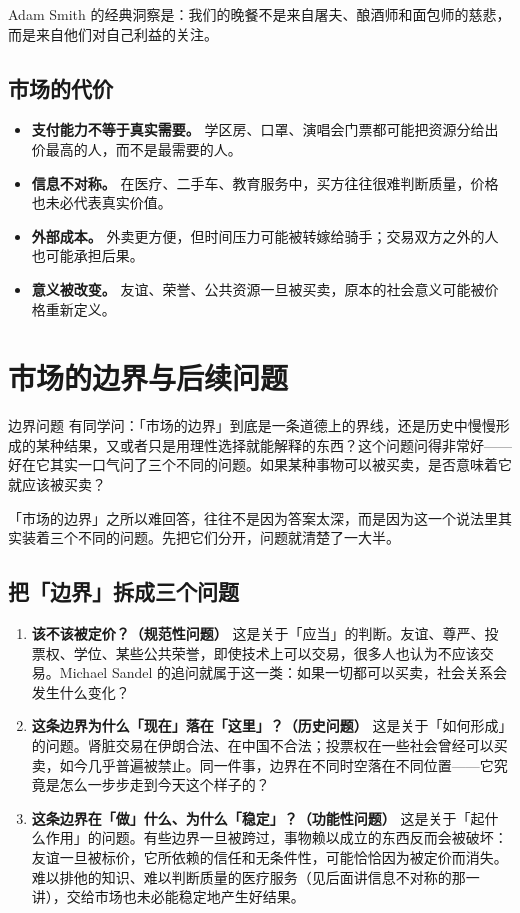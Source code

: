 \documentclass[10pt,a4paper]{ctexart}
\begin{document}
Adam Smith 的经典洞察是：我们的晚餐不是来自屠夫、酿酒师和面包师的慈悲，而是来自他们对自己利益的关注。

\subsection{市场的代价}

\begin{itemize}
  \item \textbf{支付能力不等于真实需要。} 学区房、口罩、演唱会门票都可能把资源分给出价最高的人，而不是最需要的人。
  \item \textbf{信息不对称。} 在医疗、二手车、教育服务中，买方往往很难判断质量，价格也未必代表真实价值。
  \item \textbf{外部成本。} 外卖更方便，但时间压力可能被转嫁给骑手；交易双方之外的人也可能承担后果。
  \item \textbf{意义被改变。} 友谊、荣誉、公共资源一旦被买卖，原本的社会意义可能被价格重新定义。
\end{itemize}

\section{市场的边界与后续问题}

\begin{discussionbox}{边界问题}
有同学问：「市场的边界」到底是一条道德上的界线，还是历史中慢慢形成的某种结果，又或者只是用理性选择就能解释的东西？这个问题问得非常好——好在它其实一口气问了三个不同的问题。如果某种事物可以被买卖，是否意味着它就应该被买卖？
\end{discussionbox}

「市场的边界」之所以难回答，往往不是因为答案太深，而是因为这一个说法里其实装着三个不同的问题。先把它们分开，问题就清楚了一大半。

\subsection{把「边界」拆成三个问题}

\begin{enumerate}
  \item \textbf{该不该被定价？（规范性问题）} 这是关于「应当」的判断。友谊、尊严、投票权、学位、某些公共荣誉，即使技术上可以交易，很多人也认为不应该交易。Michael Sandel 的追问就属于这一类：如果一切都可以买卖，社会关系会发生什么变化？
  \item \textbf{这条边界为什么「现在」落在「这里」？（历史问题）} 这是关于「如何形成」的问题。肾脏交易在伊朗合法、在中国不合法；投票权在一些社会曾经可以买卖，如今几乎普遍被禁止。同一件事，边界在不同时空落在不同位置——它究竟是怎么一步步走到今天这个样子的？
  \item \textbf{这条边界在「做」什么、为什么「稳定」？（功能性问题）} 这是关于「起什么作用」的问题。有些边界一旦被跨过，事物赖以成立的东西反而会被破坏：友谊一旦被标价，它所依赖的信任和无条件性，可能恰恰因为被定价而消失。难以排他的知识、难以判断质量的医疗服务（见后面讲信息不对称的那一讲），交给市场也未必能稳定地产生好结果。
\end{enumerate}
\end{document}
